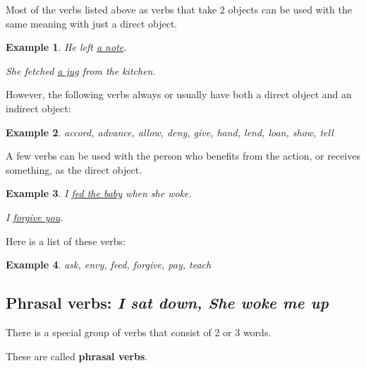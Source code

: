 \documentclass[oneside]{book}
\numberwithin{equation}{section}
\newtheorem{example}{Example}[section]
\begin{document}
%
\noindent{} Most of the verbs listed above as verbs that take 2 objects can be used with the same meaning with just a direct object.
\begin{example}
    He left \underline{a note}.
    
    She fetched \underline{a jug} from the kitchen.
\end{example}
However, the following verbs always or usually have both a direct object and an indirect object:
\begin{example}
    accord, advance, allow, deny, give, hand, lend, loan, show, tell
\end{example}
A few verbs can be used with the person who benefits from the action, or receives something, as the direct object.
\begin{example}
    I \underline{fed the baby} when she woke.
    
    I \underline{forgive you}.
\end{example}
Here is a list of these verbs:
\begin{example}
    ask, envy, feed, forgive, pay, teach
\end{example}

\subsection{Phrasal verbs: \textit{I sat down, She woke me up}}
\noindent{} There is a special group of verbs that consist of 2 or 3 words.

These are called \textbf{phrasal verbs}.
\end{document}
